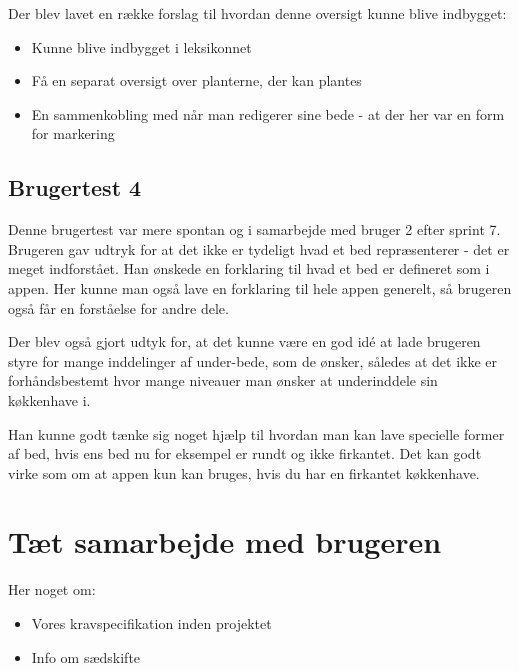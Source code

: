 Der blev lavet en række forslag til hvordan denne oversigt  kunne blive indbygget:
\begin{itemize}
    \item Kunne blive indbygget i leksikonnet
    \item Få en separat oversigt over planterne, der kan plantes
    \item En sammenkobling med når man redigerer sine bede - at der her var en form for markering
\end{itemize}

\subsection{Brugertest 4}

Denne brugertest var mere spontan og i samarbejde med bruger 2 efter sprint 7. Brugeren gav udtryk for at det ikke er tydeligt hvad et bed repræsenterer - det er meget indforstået. Han ønskede en forklaring til hvad et bed er defineret som i appen. Her kunne man også lave en forklaring til hele appen generelt, så brugeren også får en forståelse for andre dele.

Der blev også gjort udtyk for, at det kunne være en god idé at lade brugeren styre for mange inddelinger af under-bede, som de ønsker, således at det ikke er forhåndsbestemt hvor mange niveauer man ønsker at underinddele sin køkkenhave i.

Han kunne godt tænke sig noget hjælp til hvordan man kan lave specielle former af bed, hvis ens bed nu for eksempel er rundt og ikke firkantet. Det kan godt virke som om at appen kun kan bruges, hvis du har en firkantet køkkenhave.

\section{Tæt samarbejde med brugeren}
Her noget om:
\begin{itemize}
    \item Vores kravspecifikation inden projektet
    \item Info om sædskifte
\end{itemize} 